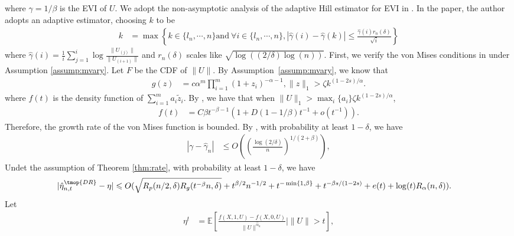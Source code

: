   where $\gamma = 1 / \beta$ is the EVI of $U$. 
  We adopt the non-asymptotic analysis of the adaptive Hill estimator for EVI
  in {\citep{boucheron2015tail}}. In the paper, the author adopts an adaptive
  estimator, choosing $k$ to be
  \begin{align*}
    k & = \max \left\{ k \in \{l_n, \cdots, n\} \text{and} \  \forall i \in
    \{l_n, \cdots, n\}, | \hat{\gamma}(i) - \hat{\gamma}(k) | \leqslant
    \frac{\hat{\gamma}(i) r_n (\delta)}{\sqrt{i}} \right\}
  \end{align*}
  where $\hat{\gamma}(i) = \frac{1}{i} \sum_{j=1}^i \log \frac{\|U_{(j)}\|}{\|U_{(i+1)}\|}$ and $r_n (\delta)$ scales like $\sqrt{\log ((2 / \delta) \log (n))}$.
  First, we verify the von Mises conditions in \cite{boucheron2015tail} under Assumption \ref{assump:mvary}. Let $F$ be the CDF of $\|U\|$. By
  Assumption~\ref{assump:mvary}, we know that
  \begin{align*}
    g (z) & = c \alpha^m  \prod_{i = 1}^m (1 + z_i)^{- \alpha - 1}, \|z\|_1 >
    \zeta k^{(1 - 2 s) / \alpha} .
  \end{align*}
  where $f (t)$ is the density function of $\sum_{i = 1}^m a_i \tilde{z}_i$. By
  {\citetext{\citealp{nguyen2014tail},  Theorem 2.1}}, we have that when
  $\|U\|_1 > \max_i \{a_i \} \zeta k^{(1 - 2 s) / \alpha}$,
  \begin{align}
    f (t) & = C \beta t^{- \beta - 1} (1 + D (1 - 1 / \beta) t^{- 1} + o (t^{-
    1})) .  \label{eq:density_f}
  \end{align}
  Therefore, the growth rate of the von Mises function is bounded. By
  {\citep{boucheron2015tail}}, with probability at least $1 - \delta$, we have
  \begin{align*}
    | \gamma - \hat{\gamma}_n | & \leqslant O \left( \left( \frac{\log (2 /
    \delta)}{n} \right)^{1 / (2 + \beta)} \right),
  \end{align*}
  \label{lemma:eta_rate}Undet the assumption of Theorem \ref{thm:rate}, with
  probability at least $1 - \delta$, we have
  \begin{align*}
    | \hat{\eta}_{n, t}^{\tmop{DR}} - \eta | & \leqslant O (\sqrt{R_p (n/2, \delta) R_g
    (t^{- \beta} n, \delta)} + t^{\beta / 2} n^{- 1 / 2} + t^{- \min \{1,
    \beta\}} + t^{- \beta s / (1 - 2 s)} + e (t) + \log (t) R_{\alpha} (n,\delta)) .
  \end{align*}
  Let
  \begin{align*}
    \eta^t & =\mathbb{E} \left[ \frac{f (X, 1, U) - f (X, 0,
    U)}{\|U\|^{\hat{\alpha}_{n}}} \mid \|U\|> t \right],
  \end{align*}
  
